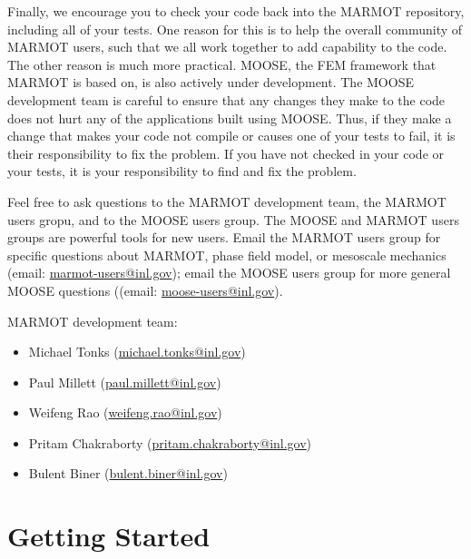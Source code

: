 \documentclass[letter,12pt,fleqn]{article}
\begin{document}
Finally, we encourage you to check your code back into the MARMOT repository, including all of your tests.  One reason for this is to help the overall community of MARMOT users, such that we all work together to add capability to the code.  The other reason is much more practical.  MOOSE, the FEM framework that MARMOT is based on, is also actively under development.  The MOOSE development team is careful to ensure that any changes they make to the code does not hurt any of the applications built using MOOSE.  Thus, if they make a change that makes your code not compile or causes one of your tests to fail, it is their responsibility to fix the problem.  If you have not checked in your code or your tests, it is your responsibility to find and fix the problem.

Feel free to ask questions to the MARMOT development team, the MARMOT users gropu, and to the MOOSE users group.  The MOOSE and MARMOT users groups are powerful tools for new users. Email the MARMOT users group for specific questions about MARMOT, phase field model, or mesoscale mechanics (email: \href{mailto:marmot-users@lists.inl.gov}{marmot-users@inl.gov}); email the MOOSE users group for more general MOOSE questions ((email: \href{mailto:moose-users@inl.gov}{moose-users@inl.gov}).

\vspace{20pt}

\noindent MARMOT development team:

\begin{itemize}
\item Michael Tonks (\href{mailto:michael.tonks@inl.gov}{michael.tonks@inl.gov})
\item Paul Millett (\href{mailto:paul.millett@inl.gov}{paul.millett@inl.gov})
\item Weifeng Rao (\href{mailto:weifeng.rao@inl.gov}{weifeng.rao@inl.gov})
\item Pritam  Chakraborty (\href{mailto:pritam.chakraborty@inl.gov}{pritam.chakraborty@inl.gov})
\item Bulent Biner (\href{mailto:bulent.biner@inl.gov}{bulent.biner@inl.gov})
\end{itemize}





\section{Getting Started}
\end{document}
